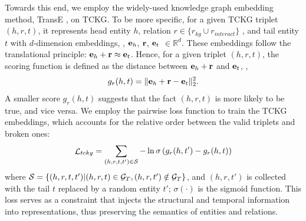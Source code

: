 Towards this end, we employ the widely-used knowledge graph embedding method, TransE \cite{transE}, on TCKG.
To be more specific, for a given TCKG triplet $(h,r,t)$, it represents head entity $h$, relation $r \in \{r_{kg} \cup r_{interact}\}$ 
, and tail entity $t$ with $d$-dimension embeddings, \ie, $\textbf{e}_{h}$, $\textbf{r}$, $\textbf{e}_{t}$ $\in \mathbb{R}^d$.
These embeddings follow the translational principle: $\textbf{e}_h + \textbf{r} \approx \textbf{e}_t$.
Hence,  for a given triplet $(h, r, t)$, the scoring function is defined as the distance between $\textbf{e}_h + \textbf{r}$ and $\textbf{e}_t$, \ie,
\begin{equation}\label{trans}
	g_{r}({h},{t})=\|\textbf{e}_h+\textbf{r}-
	\textbf{e}_t\|_2^2 .
\end{equation}
A smaller score $g_{r}(h, t)$ suggests that the fact $(h, r, t)$ is more likely to be true, and vice versa. 
We employ the pairwise loss function to train the TCKG embeddings, which accounts for the relative order between the valid triplets and broken ones:
\begin{equation}\label{eqtranse}
    \mathbf{\mathop{\mathcal{L}}}_{tckg}=\sum_{\left(h, r, t, t'\right) \in \mathcal{S}}-\ln\sigma\left(g_{r}({h},{t}') - g_{r}({h},{t})\right)
\end{equation}
where $\mathcal{S} = \{(h, r, t, t') | (h, r, t) \in \mathcal{G}_T, (h, r, t') \notin \mathcal{G}_T\}$, and $ (h, r, t')$ is collected with the tail $t$ replaced by a random entity $t'$; 
$\sigma(\cdot)$ is the sigmoid function. 
This loss serves as a constraint that injects the structural and temporal information into representations, thus preserving the semantics of entities and relations.





